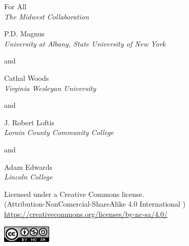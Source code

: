 \setlength{\parindent}{0em}
\thispagestyle{empty}



{\huge For All }\\ \vspace{24pt}
{\Large \emph{The Midwest Collaboration}}\\




\vfill

{\sf P.D. Magnus}\\
\emph{University at Albany, State University of New York}

and

{\sf Cathal Woods}\\
\emph{Virginia Wesleyan University}

and

{\sf J. Robert Loftis}\\
\emph{Lorain County Community College}

and

{\sf Adam Edwards}\\
\emph{Lincoln College}


\vfill



{\footnotesize Licensed under a Creative Commons license.\\
	(Attribution-NonComercial-ShareAlike 4.0 International )
	\url{https://creativecommons.org/licenses/by-nc-sa/4.0/}


\includegraphics[width=66pt, height=23pt, keepaspectratio=true]{img/cc-by-nc-sa.png}

}




